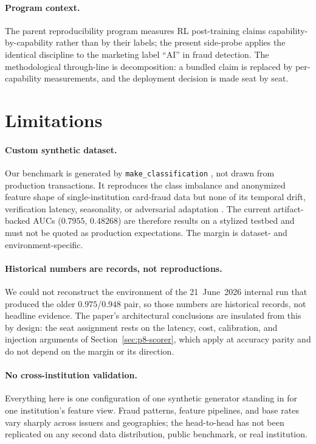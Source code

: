 \documentclass{article}
\providecommand{\secref}[1]{Section~\ref{#1}}
\begin{document}
\paragraph{Program context.} The parent reproducibility program measures
RL post-training claims capability-by-capability rather than by their labels;
the present side-probe applies the identical discipline to the marketing label
``AI'' in fraud detection. The methodological through-line is decomposition:
a bundled claim is replaced by per-capability measurements, and the deployment
decision is made seat by seat.
 \section{Limitations}
\label{sec:p8-limitations}

\paragraph{Custom synthetic dataset.} Our benchmark is generated by
\texttt{make\_classification} \citep{pedregosa2011sklearn}, not drawn from
production transactions. It reproduces the class imbalance and anonymized
feature shape of single-institution card-fraud data but none of its temporal
drift, verification latency, seasonality, or adversarial adaptation
\citep{dalpozzolo2018realistic}. The current artifact-backed AUCs
($0.7955$, $0.48268$) are therefore results on a stylized testbed and must not
be quoted as production expectations. The margin is dataset- and
environment-specific.

\paragraph{Historical numbers are records, not reproductions.} We could not
reconstruct the environment of the 21~June~2026 internal run that produced the
older $0.975$/$0.948$ pair, so those numbers are historical records, not
headline evidence. The paper's architectural conclusions are
insulated from this by design: the seat assignment rests on the latency, cost,
calibration, and injection arguments of \secref{sec:p8-scorer}, which apply at
accuracy parity and do not depend on the margin or its direction.

\paragraph{No cross-institution validation.} Everything here is one
configuration of one synthetic generator standing in for one institution's
feature view. Fraud patterns, feature pipelines, and base rates vary sharply
across issuers and geographies; the head-to-head has not been replicated on
any second data distribution, public benchmark, or real institution.
\end{document}
